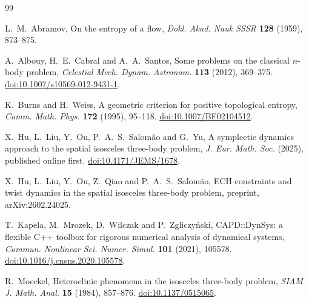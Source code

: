 \documentclass[11pt]{article}
\begin{document}
\begin{thebibliography}{99}

L.~M.~Abramov,
\newblock On the entropy of a flow,
\newblock \emph{Dokl. Akad. Nauk SSSR} \textbf{128} (1959), 873--875.

A.~Albouy, H.~E.~Cabral and A.~A.~Santos,
\newblock Some problems on the classical $n$-body problem,
\newblock \emph{Celestial Mech. Dynam. Astronom.} \textbf{113} (2012),
369--375.
\newblock \href{https://doi.org/10.1007/s10569-012-9431-1}
{doi:10.1007/s10569-012-9431-1}.

K.~Burns and H.~Weiss,
\newblock A geometric criterion for positive topological entropy,
\newblock \emph{Comm. Math. Phys.} \textbf{172} (1995), 95--118.
\newblock \href{https://doi.org/10.1007/BF02104512}
{doi:10.1007/BF02104512}.

X.~Hu, L.~Liu, Y.~Ou, P.~A.~S.~Salom\~ao and G.~Yu,
\newblock A symplectic dynamics approach to the spatial isosceles three-body
problem,
\newblock \emph{J. Eur. Math. Soc.} (2025), published online first.
\newblock \href{https://doi.org/10.4171/JEMS/1678}{doi:10.4171/JEMS/1678}.

X.~Hu, L.~Liu, Y.~Ou, Z.~Qiao and P.~A.~S.~Salom\~ao,
\newblock ECH constraints and twist dynamics in the spatial isosceles
three-body problem,
\newblock preprint, arXiv:2602.24025.

T.~Kapela, M.~Mrozek, D.~Wilczak and P.~Zgliczy\'nski,
\newblock CAPD::DynSys: a flexible C++ toolbox for rigorous numerical
analysis of dynamical systems,
\newblock \emph{Commun. Nonlinear Sci. Numer. Simul.} \textbf{101} (2021),
105578.
\newblock \href{https://doi.org/10.1016/j.cnsns.2020.105578}
{doi:10.1016/j.cnsns.2020.105578}.

R.~Moeckel,
\newblock Heteroclinic phenomena in the isosceles three-body problem,
\newblock \emph{SIAM J. Math. Anal.} \textbf{15} (1984), 857--876.
\newblock \href{https://doi.org/10.1137/0515065}
{doi:10.1137/0515065}.

\end{thebibliography}
\end{document}
